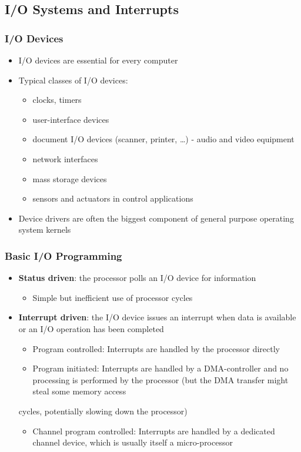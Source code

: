 \documentclass[11pt]{article}
\begin{document}
\subsubsection{}
\label{sec:org77de38c}
\subsection{I/O Systems and Interrupts}
\label{sec:org624e4c3}
\subsubsection{I/O Devices}
\label{sec:org3dab95f}
\begin{itemize}
\item I/O devices are essential for every computer
\item Typical classes of I/O devices:
\begin{itemize}
\item clocks, timers
\item user-interface devices
\item document I/O devices (scanner, printer, \ldots{})   - audio and video equipment
\item network interfaces
\item mass storage devices
\item sensors and actuators in control applications
\end{itemize}
\item Device drivers are often the biggest component of general purpose operating system kernels
\end{itemize}
\subsubsection{Basic I/O Programming}
\label{sec:orgabd7e4c}
\begin{itemize}
\item \textbf{Status driven}: the processor polls an I/O device for information
\begin{itemize}
\item Simple but inefficient use of processor cycles
\end{itemize}
\item \textbf{Interrupt driven}: the I/O device issues an interrupt when data is available or an I/O operation has been completed
\begin{itemize}
\item Program controlled: Interrupts are handled by the processor directly
\item Program initiated: Interrupts are handled by a DMA-controller and no processing is performed by the processor (but the DMA transfer might steal some memory access
\end{itemize}
cycles, potentially slowing down the processor)
\begin{itemize}
\item Channel program controlled: Interrupts are handled by a dedicated channel device, which is usually itself a micro-processor
\end{itemize}
\end{itemize}
\end{document}
